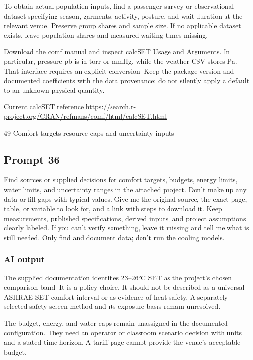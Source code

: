 To obtain actual population inputs, find a passenger survey or observational dataset specifying season, garments, activity, posture, and wait duration at the relevant venue. Preserve group shares and sample size. If no applicable dataset exists, leave population shares and measured waiting times missing.

Download the comf manual and inspect calcSET Usage and Arguments. In particular, pressure pb is in torr or mmHg, while the weather CSV stores Pa. That interface requires an explicit conversion. Keep the package version and documented coefficients with the data provenance; do not silently apply a default to an unknown physical quantity.

Current calcSET reference  \url{https://search.r-project.org/CRAN/refmans/comf/html/calcSET.html}

49 Comfort targets resource caps and uncertainty inputs

\subsection*{Prompt 36}
Find sources or supplied decisions for comfort targets, budgets, energy limits, water limits, and uncertainty ranges in the attached project. Don’t make up any data or fill gaps with typical values. Give me the original source, the exact page, table, or variable to look for, and a link with steps to download it. Keep measurements, published specifications, derived inputs, and project assumptions clearly labeled. If you can’t verify something, leave it missing and tell me what is still needed. Only find and document data; don’t run the cooling models.

\subsubsection*{AI output}
The supplied documentation identifies 23–26°C SET as the project’s chosen comparison band. It is a policy choice. It should not be described as a universal ASHRAE SET comfort interval or as evidence of heat safety. A separately selected safety-screen method and its exposure basis remain unresolved.

The budget, energy, and water caps remain unassigned in the documented configuration. They need an operator or classroom scenario decision with units and a stated time horizon. A tariff page cannot provide the venue’s acceptable budget.

